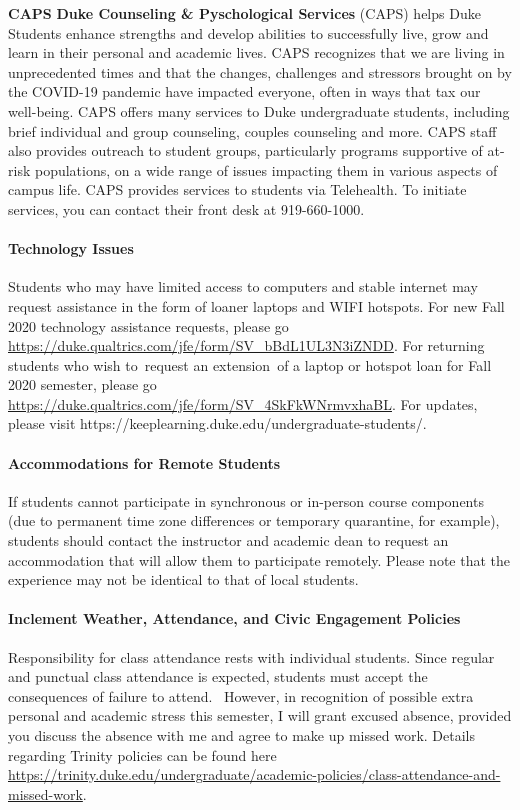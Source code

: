 \documentclass[11pt]{article}
\begin{document}
\textbf{CAPS}
\textbf{Duke Counseling \& Pyschological Services} (CAPS) helps Duke Students enhance strengths and develop abilities to successfully live, grow and learn in their personal and academic lives. CAPS recognizes that we are living in unprecedented times and that the changes, challenges and stressors brought on by the COVID-19 pandemic have impacted everyone, often in ways that tax our well-being. CAPS offers many services to Duke undergraduate students, including brief individual and group counseling, couples counseling and more. CAPS staff also provides outreach to student groups, particularly programs supportive of at-risk populations, on a wide range of issues impacting them in various aspects of campus life. CAPS provides services to students via Telehealth. To initiate services, you can contact their front desk at 919-660-1000.\\

\paragraph{Technology Issues}

Students who may have limited access to computers and stable internet may request assistance in the form of loaner laptops and WIFI hotspots.  For new Fall 2020 technology assistance requests, please go \url{https://duke.qualtrics.com/jfe/form/SV_bBdL1UL3N3iZNDD}.  For returning students who wish to request an extension of a laptop or hotspot loan for Fall 2020 semester, please go \url{https://duke.qualtrics.com/jfe/form/SV_4SkFkWNrmvxhaBL}. For updates, please visit https://keeplearning.duke.edu/undergraduate-students/.\\

\paragraph{Accommodations for Remote Students}
If students cannot participate in synchronous or in-person course components (due to permanent time zone differences or temporary quarantine, for example), students should contact the instructor and academic dean to request an accommodation that will allow them to participate remotely. Please note that the experience may not be identical to that of local students.\\

\paragraph{Inclement Weather, Attendance, and Civic Engagement Policies}
Responsibility for class attendance rests with individual students. Since regular and punctual class attendance is expected, students must accept the consequences of failure to attend.  However, in recognition of possible extra personal and academic stress this semester, I will grant excused absence, provided you discuss the absence with me and agree to make up missed work. Details regarding Trinity policies can be found here \url{https://trinity.duke.edu/undergraduate/academic-policies/class-attendance-and-missed-work}. \\
\end{document}
